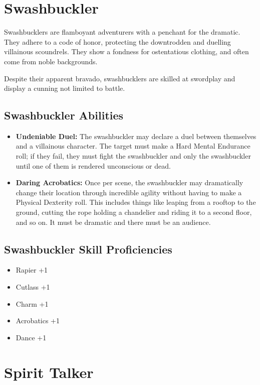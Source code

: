 \begin{multicols}{2}
\section{Swashbuckler}

Swashbucklers are flamboyant adventurers with a penchant for the dramatic.
They adhere to a code of honor, protecting the downtrodden and duelling
villainous scoundrels. They show a fondness for ostentatious clothing, and
often come from noble backgrounds.

Despite their apparent bravado, swashbucklers are skilled at swordplay and
display a cunning not limited to battle.

\subsection{Swashbuckler Abilities}

\begin{itemize}
  \item \textbf{Undeniable Duel:} The swashbuckler may declare a duel between
    themselves and a villainous character. The target must make a Hard Mental
    Endurance roll; if they fail, they must fight the swashbuckler and only the
    swashbuckler until one of them is rendered unconscious or dead.
  \item \textbf{Daring Acrobatics:} Once per scene, the swashbuckler may
    dramatically change their location through incredible agility without having
    to make a Physical Dexterity roll. This includes things like leaping from a
    rooftop to the ground, cutting the rope holding a chandelier and riding it to
    a second floor, and so on. It must be dramatic and there must be an audience.
\end{itemize}

\subsection{Swashbuckler Skill Proficiencies}

\begin{itemize}
  \item Rapier +1
  \item Cutlass +1
  \item Charm +1
  \item Acrobatics +1
  \item Dance +1
\end{itemize}

\section{Spirit Talker}


\end{multicols}
